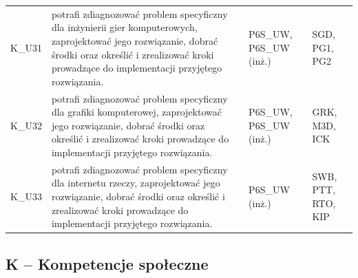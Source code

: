 \documentclass[12pt,a4paper]{article}
\begin{document}
{\begin{longtable}{m{1cm}m{8.8cm}m{2.1cm}m{2.5cm}}
\rowcolor{tableRowLight} K\_U31 & potrafi zdiagnozować problem specyficzny dla inżynierii gier komputerowych, zaprojektować jego rozwiązanie, dobrać środki oraz określić i zrealizować kroki prowadzące do implementacji przyjętego rozwiązania. & {\scriptsize P6S\_UW, P6S\_UW {\scriptsize (inż.)}} & {\scriptsize SGD, PG1, PG2} \\
\rowcolor{tableRowAlt} K\_U32 & potrafi zdiagnozować problem specyficzny dla grafiki komputerowej, zaprojektować jego rozwiązanie, dobrać środki oraz określić i zrealizować kroki prowadzące do implementacji przyjętego rozwiązania. & {\scriptsize P6S\_UW, P6S\_UW {\scriptsize (inż.)}} & {\scriptsize GRK, M3D, ICK} \\
\rowcolor{tableRowLight} K\_U33 & potrafi zdiagnozować problem specyficzny dla internetu rzeczy, zaprojektować jego rozwiązanie, dobrać środki oraz określić i zrealizować kroki prowadzące do implementacji przyjętego rozwiązania. & {\scriptsize P6S\_UW {\scriptsize (inż.)}} & {\scriptsize SWB, PTT, RTO, KIP} \\
\bottomrule
\end{longtable}}

\subsection*{K -- Kompetencje społeczne}
\end{document}
